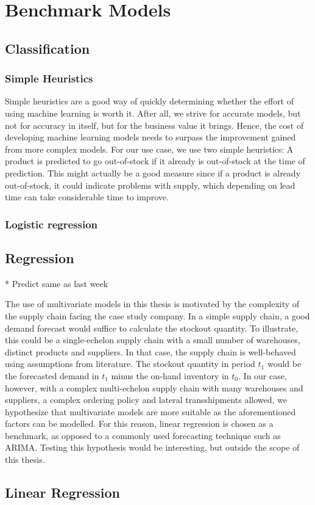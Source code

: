 \documentclass[../../main.tex]{subfiles}
\begin{document}

\section{Benchmark Models}

\subsection{Classification}
\subsubsection{Simple Heuristics}
Simple heuristics are a good way of quickly determining whether the effort of using machine learning is worth it. After all, we strive for accurate models, but not for accuracy in itself, but for the business value it brings. Hence, the cost of developing machine learning models needs to surpass the improvement gained from more complex models. For our use case, we use two simple heuristics: A product is predicted to go out-of-stock if it already is out-of-stock at the time of prediction. This might actually be a good measure since if a product is already out-of-stock, it could indicate problems with supply, which depending on lead time can take considerable time to improve.

\subsubsection{Logistic regression}

\subsection{Regression}
* Predict same as last week

The use of multivariate models in this thesis is motivated by the complexity of the supply chain facing the case study company. In a simple supply chain, a good demand forecast would suffice to calculate the stockout quantity. To illustrate, this could be a single-echelon supply chain with a small number of warehouses, distinct products and suppliers. In that case, the supply chain is well-behaved using assumptions from literature. The stockout quantity in period $t_1$ would be the forecasted demand in $t_1$ minus the on-hand inventory in $t_0$. In our case, however, with a complex multi-echelon supply chain with many warehouses and suppliers, a complex ordering policy and lateral transshipments allowed, we hypothesize that multivariate models are more suitable as the aforementioned factors can be modelled. For this reason, linear regression is chosen as a benchmark, as opposed to a commonly used forecasting technique such as ARIMA. Testing this hypothesis would be interesting, but outside the scope of this thesis.

\subsection{Linear Regression}

\end{document}
